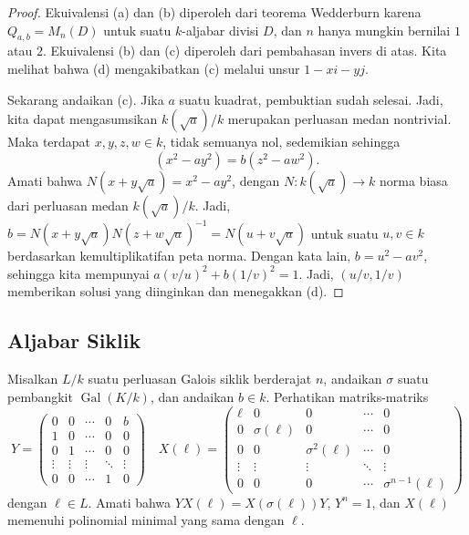 \documentclass[12pt]{article}
\theoremstyle{plain}
\theoremstyle{definition}
\theoremstyle{remark}
\numberwithin{equation}{section}
\begin{document}
\begin{proof}
Ekuivalensi (a) dan (b) diperoleh dari teorema Wedderburn
karena $Q_{a,b}=M_n(D)$ untuk suatu $k$-aljabar divisi $D$, dan
$n$ hanya mungkin bernilai $1$ atau $2$.
Ekuivalensi (b) dan (c) diperoleh dari pembahasan invers
di atas.
Kita melihat bahwa (d) mengakibatkan (c) melalui unsur $1-xi-yj$.

Sekarang andaikan (c).
Jika $a$ suatu kuadrat, pembuktian sudah selesai. Jadi,
kita dapat mengasumsikan $k(\sqrt{a})/k$
merupakan perluasan medan nontrivial.
Maka terdapat $x,y,z,w \in k$, tidak semuanya nol,
sedemikian sehingga
\[
(x^2-ay^2)=b(z^2-aw^2).
\]
Amati bahwa $N(x+y\sqrt{a})=x^2-ay^2$, dengan $N : k(\sqrt{a}) \to k$
norma biasa dari perluasan medan $k(\sqrt{a})/k$.
Jadi, $b=N(x+y\sqrt{a})N(z+w\sqrt{a})^{-1}=N(u+v\sqrt{a})$
untuk suatu $u,v \in k$ berdasarkan kemultiplikatifan peta norma.
Dengan kata lain, $b = u^2-av^2$, sehingga kita mempunyai $a(v/u)^2 + b(1/v)^2=1$.
Jadi, $(u/v,1/v)$ memberikan solusi yang diinginkan dan menegakkan (d).
\end{proof}

\subsection{Aljabar Siklik}

Misalkan $L/k$ suatu perluasan Galois siklik berderajat $n$,
andaikan $\sigma$ suatu pembangkit $\operatorname{Gal}(K/k)$,
dan andaikan $b \in k$.
Perhatikan matriks-matriks
\[
Y = \begin{pmatrix}
0 & 0 & \cdots & 0 & b\\
1 & 0 & \cdots & 0 & 0\\
0 & 1 & \cdots & 0 & 0\\
\vdots & \vdots & \vdots &\ddots & \vdots\\
0 & 0 & \cdots & 1 & 0
\end{pmatrix}
\quad
X(\ell) = \begin{pmatrix}
\ell & 0 & 0 &\cdots & 0\\
0 & \sigma(\ell) & 0 &\cdots & 0\\
0 & 0 & \sigma^2(\ell) &\cdots & 0\\
\vdots & \vdots & \vdots &\ddots & \vdots\\
0 & 0 & 0 &\cdots & \sigma^{n-1}(\ell)
\end{pmatrix}
\]
dengan $\ell \in L$.
Amati bahwa $YX(\ell)=X(\sigma(\ell))Y$, $Y^n=1$,
dan $X(\ell)$ memenuhi polinomial minimal yang sama dengan $\ell$.
\end{document}
